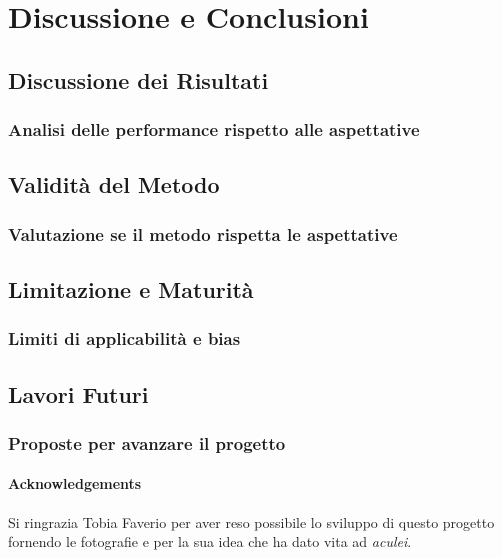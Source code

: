 \documentclass[12pt,a4paper,twoside]{article}
\begin{document}
\newpage
\section{Discussione e Conclusioni}

\subsection{Discussione dei Risultati}
\subsubsection{Analisi delle performance rispetto alle aspettative}

\subsection{Validità del Metodo}
\subsubsection{Valutazione se il metodo rispetta le aspettative}

\subsection{Limitazione e Maturità}
\subsubsection{Limiti di applicabilità e bias}

\subsection{Lavori Futuri}
\subsubsection{Proposte per avanzare il progetto}

\newpage
\paragraph{Acknowledgements} Si ringrazia Tobia Faverio per aver reso possibile lo sviluppo di 
questo progetto fornendo le fotografie e per la sua idea che ha dato vita ad \textit{aculei}.

\newpage
\printbibliography
\end{document}
